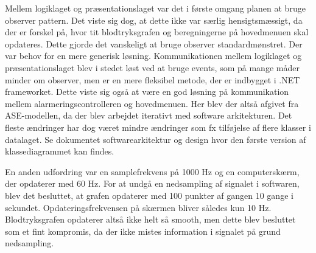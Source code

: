 Mellem logiklaget og præsentationslaget var det i første omgang planen at bruge observer pattern. Det viste sig dog, at dette ikke var særlig hensigtsmæssigt, da der er forskel på, hvor tit blodtryksgrafen og beregningerne på hovedmenuen skal opdateres. Dette gjorde det vanskeligt at bruge observer standardmønstret. Der var behov for en mere generisk løsning. Kommunikationen mellem logiklaget og præsentationslaget blev i stedet løst ved at bruge events, som på mange måder minder om observer, men er en mere fleksibel metode, der er indbygget i .NET frameworket. Dette viste sig også at være en god løsning på kommunikation mellem alarmeringscontrolleren og hovedmenuen. Her blev der altså afgivet fra ASE-modellen, da der blev arbejdet iterativt med software arkitekturen. Det fleste ændringer har dog været mindre ændringer som fx tilføjelse af flere klasser i datalaget. Se dokumentet softwarearkitektur og design hvor den første version af klassediagrammet kan findes.  

En anden udfordring var en samplefrekvens på 1000 Hz og en computerskærm, der opdaterer med 60 Hz. For at undgå en nedsampling af signalet i softwaren, blev det besluttet, at grafen opdaterer med 100 punkter af gangen 10 gange i sekundet. Opdateringsfrekvensen på skærmen bliver således kun 10 Hz. Blodtryksgrafen opdaterer altså ikke helt så smooth, men dette blev besluttet som et fint kompromis, da der ikke mistes information i signalet på grund nedsampling. 
